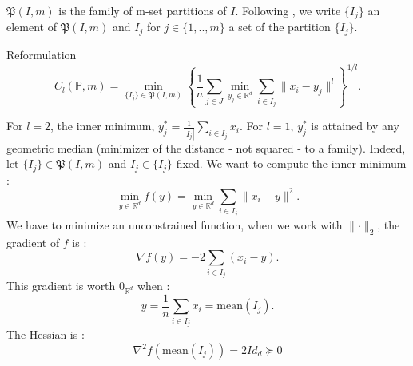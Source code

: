 \documentclass{amsart}
\newcommand{\RR}{\mathbb{R}}
\begin{document}
$\mathfrak{P}(I,m)$ is the family of m-set partitions of $I$. Following \cite{rujeerapaiboon_scenario_2022}, we write $\{I_j\}$ an element of $\mathfrak{P}(I,m)$ and $I_j$ for $j\in\{1,..,m\}$ a set of the partition $\{I_j\}$.
\begin{theorem}{Reformulation}\label{theorem1}
$$C_l(\mathbb{P},m)=\min_{\{I_j\}\in \mathfrak{P}(I,m)}\left\{ \frac{1}{n}\sum_{j\in J}\min_{y_j\in\mathbb{R}^d}\sum_{i\in I_j}\lVert x_i-y_j\rVert^l \right\}^{1/l}.$$
\end{theorem}

\begin{remark}
    For $l=2$, the inner minimum, $y_j^*=\frac{1}{|I_j|}\sum_{i\in I_j}x_i$. For $l=1$, $y_j^*$ is attained by any geometric median (minimizer of the distance - not squared - to a family). Indeed, let $\{I_j\}\in\mathfrak{P}\left(I,m\right)$ and $I_j\in\{I_j\}$ fixed. We want to compute the inner minimum : 
    $$
    \min_{y\in\RR^d}f(y)=\min_{y\in\RR^d}\sum_{i\in I_j}\lVert x_i-y\rVert^2.
    $$
    We have to minimize an unconstrained function, when we work with $\lVert\cdot\rVert_2$, the gradient of $f$ is : 
    $$
    \nabla f(y)=-2\sum_{i\in I_j}\left(x_i-y\right).
    $$
    This gradient is worth $0_{\RR^d}$ when :
    $$
    y=\frac{1}{n}\sum_{i\in I_j}x_i=\text{mean}\left(I_j\right).
    $$
    The Hessian is :    $$\nabla^2f\left(\text{mean}\left(I_j\right)\right)=2Id_d\succcurlyeq 0$$
\end{remark}
\end{document}
